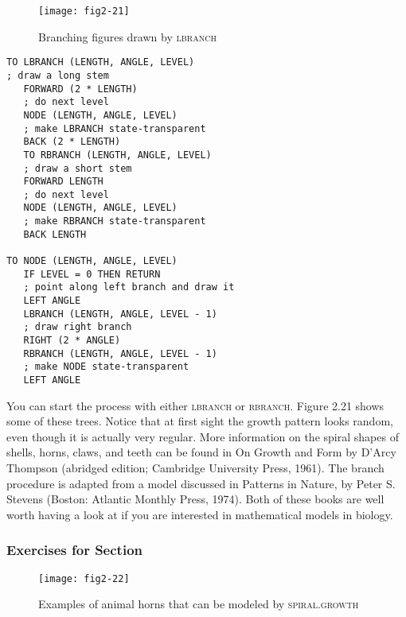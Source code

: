 \documentclass{book}
\begin{document}
\begin{figure}
\begin{center}
\texttt{[image: fig2-21]}
\caption{Branching figures drawn by \textsc{lbranch}}
\end{center}
\end{figure}


\begin{verbatim}
TO LBRANCH (LENGTH, ANGLE, LEVEL)
; draw a long stem
   FORWARD (2 * LENGTH)
   ; do next level
   NODE (LENGTH, ANGLE, LEVEL)
   ; make LBRANCH state-transparent
   BACK (2 * LENGTH)
   TO RBRANCH (LENGTH, ANGLE, LEVEL)
   ; draw a short stem
   FORWARD LENGTH
   ; do next level
   NODE (LENGTH, ANGLE, LEVEL)
   ; make RBRANCH state-transparent
   BACK LENGTH

TO NODE (LENGTH, ANGLE, LEVEL)
   IF LEVEL = 0 THEN RETURN
   ; point along left branch and draw it
   LEFT ANGLE
   LBRANCH (LENGTH, ANGLE, LEVEL - 1)
   ; draw right branch
   RIGHT (2 * ANGLE)
   RBRANCH (LENGTH, ANGLE, LEVEL - 1)
   ; make NODE state-transparent
   LEFT ANGLE
\end{verbatim}
You can start the process with either \textsc{lbranch} or \textsc{rbranch}. Figure 2.21
shows some of these trees. Notice that at first sight the growth pattern
looks random, even though it is actually very regular.
More information on the spiral shapes of shells, horns, claws, and teeth
can be found in On Growth and Form by D'Arcy Thompson (abridged
edition; Cambridge University Press, 1961). The branch procedure is
adapted from a model discussed in Patterns in Nature, by Peter S.
Stevens (Boston: Atlantic Monthly Press, 1974). Both of these books
are well worth having a look at if you are interested in mathematical
models in biology.

\subsubsection{Exercises for Section \thesection}

\begin{figure}
\begin{center}
\texttt{[image: fig2-22]}
\caption{Examples of animal horns that can be modeled by \textsc{spiral.growth}}
\end{center}
\end{figure}
\end{document}
